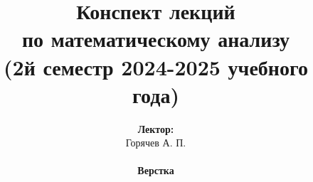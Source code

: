 \documentclass[../main.tex]{subfiles}
\begin{document}
\title{
    \bfseries
    {\Huge Конспект лекций\\ по математическому анализу}\\
    {\large (2й семестр 2024-2025 учебного года)}
}
\author{
    \textbf{Лектор:}\\ Горячев А. П.
    \\ ~ \\ 
    \textbf{Верстка}\\%
}

\date{}
\maketitle
\setcounter{page}{2}
\end{document}
